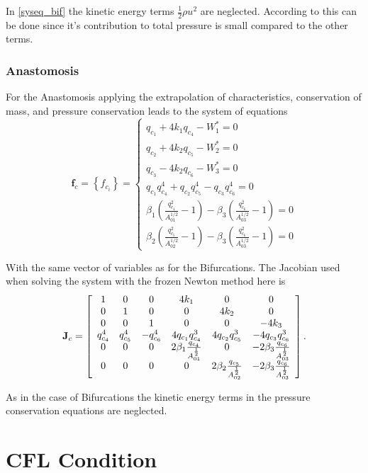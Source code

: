 \documentclass[a4paper, oneside]{discothesis}
\begin{document}
In \ref{syseq_bif} the kinetic energy terms $\frac{1}{2} \rho u^2$ are neglected.
	According to \cite{Formaggia2003OnedimensionalMF} this can be done since it's contribution to total pressure is small compared to the other terms.
\subsubsection{Anastomosis}
For the Anastomosis applying the extrapolation of characteristics, conservation of mass, and pressure conservation leads to the system of equations
$$
\mathbf{f}_c=\left\{f_{c_i}\right\}=\left\{\begin{array}{l}
		q_{c_1}+4 k_1 q_{c_4}-W_1^*=0 \\
		q_{c_2}+4 k_2 q_{c_5}-W_2^*=0 \\
		q_{c_3}-4 k_2 q_{c_6}-W_3^*=0 \\
		q_{c_1} q_{c_4}^4+q_{c_2} q_{c_5}^4-q_{c_3} q_{c_6}^4=0 \\
		\beta_1\left(\frac{q_{c_4}^2}{A_{01}^{1 / 2}}-1\right)-\beta_3\left(\frac{q_{c_6}^2}{A_{03}^{1 / 2}}-1\right)=0 \\
		\beta_2\left(\frac{q_{c_5}^2}{A_{02}^{1 / 2}}-1\right)-\beta_3\left(\frac{q_{c_6}^2}{A_{03}^{1 / 2}}-1\right)=0
\end{array}\right.
$$

With the same vector of variables as for the Bifurcations.
The Jacobian used when solving the system with the frozen Newton method here is
$$\mathbf{J}_{c}=\left[\begin{array}{c c c c c c}
		1&0&0&4k_1&0&0\\
		0&1&0&0&4k_2&0\\
		0&0&1&0&0&-4k_3\\
		q_{c_4}^4 & q_{c_5}^4 & -q_{c_6}^4 & 4q_{c_1}q_{c_4}^3 & 4q_{c_2}q_{c_5}^3 & -4q_{c_3}q_{c_6}^3 \\
		0 & 0 & 0 & 2\beta_1\frac{q_{c_4}}{A_{01}^{\frac{1}{2}}} & 0 & -2\beta_3\frac{q_{c_6}}{A_{03}^{\frac{1}{2}}} \\
		0 & 0 & 0 & 0 & 2\beta_2\frac{q_{c_5}}{A_{02}^{\frac{1}{2}}} &  -2\beta_3\frac{q_{c_6}}{A_{03}^{\frac{1}{2}}} \\
	\end{array} 
\right].
$$

As in the case of Bifurcations the kinetic energy terms in the pressure conservation equations are neglected.

\section{CFL Condition} \label{CFL}
\end{document}
